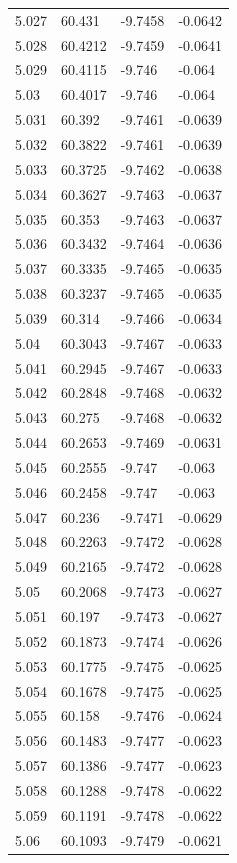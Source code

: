 \begin{tabular}{llll}
5.027 & 60.431 & -9.7458 & -0.0642 \\
5.028 & 60.4212 & -9.7459 & -0.0641 \\
5.029 & 60.4115 & -9.746 & -0.064 \\
5.03 & 60.4017 & -9.746 & -0.064 \\
5.031 & 60.392 & -9.7461 & -0.0639 \\
5.032 & 60.3822 & -9.7461 & -0.0639 \\
5.033 & 60.3725 & -9.7462 & -0.0638 \\
5.034 & 60.3627 & -9.7463 & -0.0637 \\
5.035 & 60.353 & -9.7463 & -0.0637 \\
5.036 & 60.3432 & -9.7464 & -0.0636 \\
5.037 & 60.3335 & -9.7465 & -0.0635 \\
5.038 & 60.3237 & -9.7465 & -0.0635 \\
5.039 & 60.314 & -9.7466 & -0.0634 \\
5.04 & 60.3043 & -9.7467 & -0.0633 \\
5.041 & 60.2945 & -9.7467 & -0.0633 \\
5.042 & 60.2848 & -9.7468 & -0.0632 \\
5.043 & 60.275 & -9.7468 & -0.0632 \\
5.044 & 60.2653 & -9.7469 & -0.0631 \\
5.045 & 60.2555 & -9.747 & -0.063 \\
5.046 & 60.2458 & -9.747 & -0.063 \\
5.047 & 60.236 & -9.7471 & -0.0629 \\
5.048 & 60.2263 & -9.7472 & -0.0628 \\
5.049 & 60.2165 & -9.7472 & -0.0628 \\
5.05 & 60.2068 & -9.7473 & -0.0627 \\
5.051 & 60.197 & -9.7473 & -0.0627 \\
5.052 & 60.1873 & -9.7474 & -0.0626 \\
5.053 & 60.1775 & -9.7475 & -0.0625 \\
5.054 & 60.1678 & -9.7475 & -0.0625 \\
5.055 & 60.158 & -9.7476 & -0.0624 \\
5.056 & 60.1483 & -9.7477 & -0.0623 \\
5.057 & 60.1386 & -9.7477 & -0.0623 \\
5.058 & 60.1288 & -9.7478 & -0.0622 \\
5.059 & 60.1191 & -9.7478 & -0.0622 \\
5.06 & 60.1093 & -9.7479 & -0.0621 \\

\end{tabular}
